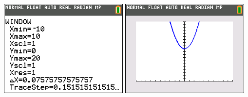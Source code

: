 \documentclass[letterpaper,12pt,fleqn]{article}
\begin{document}
\begin{enumerate}
\begin{enumerate}
  \includegraphics[scale=0.75]{hw6-5e1.png}
  \includegraphics[scale=0.75]{hw6-5e2.png}
\end{enumerate}
\end{enumerate}
\end{document}
